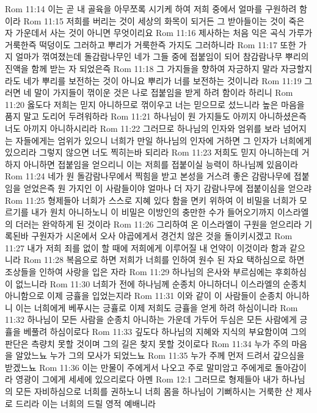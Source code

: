 Rom 11:14  이는 곧 내 골육을 아무쪼록 시기케 하여 저희 중에서 얼마를 구원하려 함이라
Rom 11:15  저희를 버리는 것이 세상의 화목이 되거든 그 받아들이는 것이 죽은 자 가운데서 사는 것이 아니면 무엇이리요
Rom 11:16  제사하는 처음 익은 곡식 가루가 거룩한즉 떡덩이도 그러하고 뿌리가 거룩한즉 가지도 그러하니라
Rom 11:17  또한 가지 얼마가 꺾여졌는데 돌감람나무인 네가 그들 중에 접붙임이 되어 참감람나무 뿌리의 진액을 함께 받는 자 되었은즉
Rom 11:18  그 가지들을 향하여 자긍하지 말라 자긍할지라도 네가 뿌리를 보전하는 것이 아니요 뿌리가 너를 보전하는 것이니라
Rom 11:19  그러면 네 말이 가지들이 꺾이운 것은 나로 접붙임을 받게 하려 함이라 하리니
Rom 11:20  옳도다 저희는 믿지 아니하므로 꺾이우고 너는 믿으므로 섰느니라 높은 마음을 품지 말고 도리어 두려워하라
Rom 11:21  하나님이 원 가지들도 아끼지 아니하셨은즉 너도 아끼지 아니하시리라
Rom 11:22  그러므로 하나님의 인자와 엄위를 보라 넘어지는 자들에게는 엄위가 있으니 너희가 만일 하나님의 인자에 거하면 그 인자가 너희에게 있으리라 그렇지 않으면 너도 찍히는바 되리라
Rom 11:23  저희도 믿지 아니하는데 거하지 아니하면 접붙임을 얻으리니 이는 저희를 접붙이실 능력이 하나님께 있음이라
Rom 11:24  네가 원 돌감람나무에서 찍힘을 받고 본성을 거스려 좋은 감람나무에 접붙임을 얻었은즉 원 가지인 이 사람들이야 얼마나 더 자기 감람나무에 접붙이심을 얻으랴
Rom 11:25  형제들아 너희가 스스로 지혜 있다 함을 면키 위하여 이 비밀을 너희가 모르기를 내가 원치 아니하노니 이 비밀은 이방인의 충만한 수가 들어오기까지 이스라엘의 더러는 완악하게 된 것이라
Rom 11:26  그리하여 온 이스라엘이 구원을 얻으리라 기록된바 구원자가 시온에서 오사 야곱에게서 경건치 않은 것을 돌이키시겠고
Rom 11:27  내가 저희 죄를 없이 할 때에 저희에게 이루어질 내 언약이 이것이라 함과 같으니라
Rom 11:28  복음으로 하면 저희가 너희를 인하여 원수 된 자요 택하심으로 하면 조상들을 인하여 사랑을 입은 자라
Rom 11:29  하나님의 은사와 부르심에는 후회하심이 없느니라
Rom 11:30  너희가 전에 하나님께 순종치 아니하더니 이스라엘의 순종치 아니함으로 이제 긍휼을 입었는지라
Rom 11:31  이와 같이 이 사람들이 순종치 아니하니 이는 너희에게 베푸시는 긍휼로 이제 저희도 긍휼을 얻게 하려 하심이니라
Rom 11:32  하나님이 모든 사람을 순종치 아니하는 가운데 가두어 두심은 모든 사람에게 긍휼을 베풀려 하심이로다
Rom 11:33  깊도다 하나님의 지혜와 지식의 부요함이여 그의 판단은 측량치 못할 것이며 그의 길은 찾지 못할 것이로다
Rom 11:34  누가 주의 마음을 알았느뇨 누가 그의 모사가 되었느뇨
Rom 11:35  누가 주께 먼저 드려서 갚으심을 받겠느뇨
Rom 11:36  이는 만물이 주에게서 나오고 주로 말미암고 주에게로 돌아감이라 영광이 그에게 세세에 있으리로다 아멘
Rom 12:1  그러므로 형제들아 내가 하나님의 모든 자비하심으로 너희를 권하노니 너희 몸을 하나님이 기뻐하시는 거룩한 산 제사로 드리라 이는 너희의 드릴 영적 예배니라

